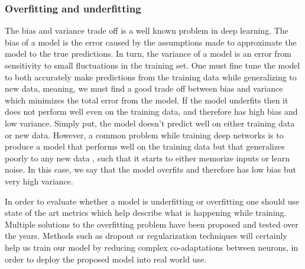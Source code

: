 \documentclass[journal,compsoc]{IEEEtran}
\begin{document}
\subsubsection{Overfitting and underfitting}
The bias and variance trade off is a well known problem in deep learning. The bias of a model is the error caused by the assumptions made to approximate the model to the true predictions. In turn, the variance of a model is an error from sensitivity to small fluctuations in the training set. One must fine tune the model to both accurately make predictions from the training data while generalizing to new data, meaning, we must find a good trade off between bias and variance which minimizes the total error from the model.
If the model underfits then it does not perform well even on the training data, and therefore has high bias and low variance. Simply put, the model doesn't predict well on either training data or new data. However, a common problem while training deep networks is to produce a model that performs well on the training data but that generalizes poorly to any new data \cite{Grus}, such that it starts to either memorize inputs or learn noise. In this case, we say that the model overfits and therefore has low bias but very high variance. \par
In order to evaluate whether a model is underfitting or overfitting one should use state of the art metrics which help describe what is happening while training.  
Multiple solutions to the overfitting problem have been proposed and tested over the years. Methods such as dropout or regularization techniques will certainly help us train our model by reducing complex co-adaptations between neurons, in order to deploy the proposed model into real world use.
\end{document}
